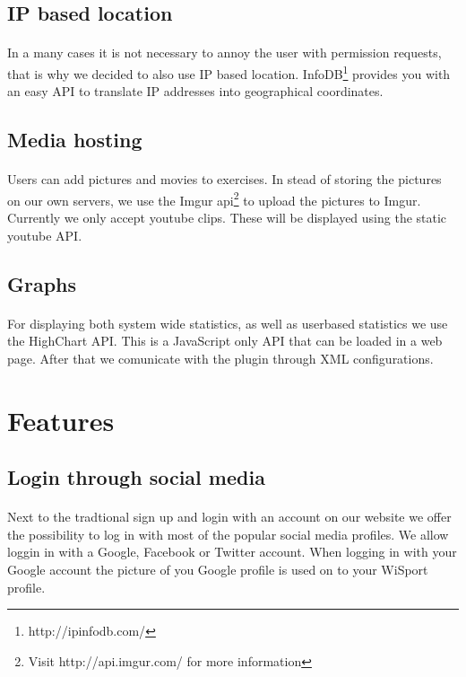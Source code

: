 \documentclass[11pt,a4paper]{scrartcl}
\begin{document}
\subsection{IP based location}
\paragraph{}In a many cases it is not necessary to annoy the user with permission requests, that is why we decided to also use IP based location. InfoDB\footnote{http://ipinfodb.com/} provides you with an easy API to translate IP addresses into geographical coordinates.
\subsection{Media hosting}
\paragraph{}Users can add pictures and movies to exercises. In stead of storing the pictures on our own servers, we use the Imgur api\footnote{Visit http://api.imgur.com/ for more information} to upload the pictures to Imgur. Currently we only accept youtube clips. These will be displayed using the static youtube API.
\subsection{Graphs}
\paragraph{}For displaying both system wide statistics, as well as userbased statistics we use the HighChart API. This is a JavaScript only API that can be loaded in a web page. After that we comunicate with the plugin through XML configurations.

\section{Features}
\subsection{Login through social media}
\paragraph{}Next to the tradtional sign up and login with an account on our website we offer the possibility to log in with most of the popular social media profiles. We allow loggin in  with a Google, Facebook or Twitter account. When logging in with your Google account the picture of you Google profile is used on to your WiSport profile.
\end{document}
